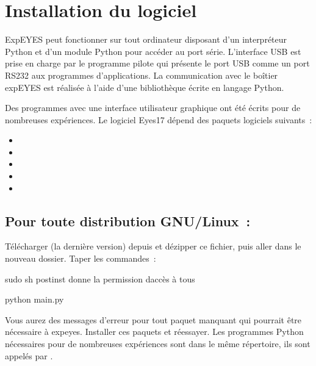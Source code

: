 \documentclass[a4paper,12pt,french]{sphinxmanual}
\begin{document}
\chapter{Installation du logiciel}
\label{\detokenize{1.3:installation-du-logiciel}}\label{\detokenize{1.3::doc}}
ExpEYES peut fonctionner sur tout ordinateur disposant d’un interpréteur
Python et d’un module Python pour accéder au port série. L’interface
USB est prise en charge par le programme pilote qui présente le port
USB comme un port RS232 aux programmes d’applications. La communication
avec le boîtier expEYES est réalisée à l’aide d’une bibliothèque écrite
en langage Python.

Des programmes avec une interface utilisateur graphique ont été écrits
pour de nombreuses expériences. Le logiciel Eyes17 dépend des paquets
logiciels suivants :
\begin{itemize}
\item {} 

\item {} 

\item {} 

\item {} 

\item {} 

\end{itemize}


\section{Pour toute distribution GNU/Linux :}
\label{\detokenize{1.3:pour-toute-distribution-gnu-linux}}
Télécharger  (la dernière version) depuis
 et dézipper ce fichier, puis aller dans
le nouveau dossier. Taper les commandes :

\begin{sphinxVerbatim}[commandchars=\\\{\}]
\PYGZdl{} sudo sh postinst       \PYGZsh{} donne la permission d\PYGZsq{}accès à tous

\PYGZdl{} python main.py
\end{sphinxVerbatim}

Vous aurez des messages d’erreur pour tout paquet manquant qui pourrait
être nécessaire à expeyes. Installer ces paquets et réessayer. Les
programmes Python nécessaires pour de nombreuses expériences sont
dans le même répertoire, ils sont appelés par .
\end{document}
